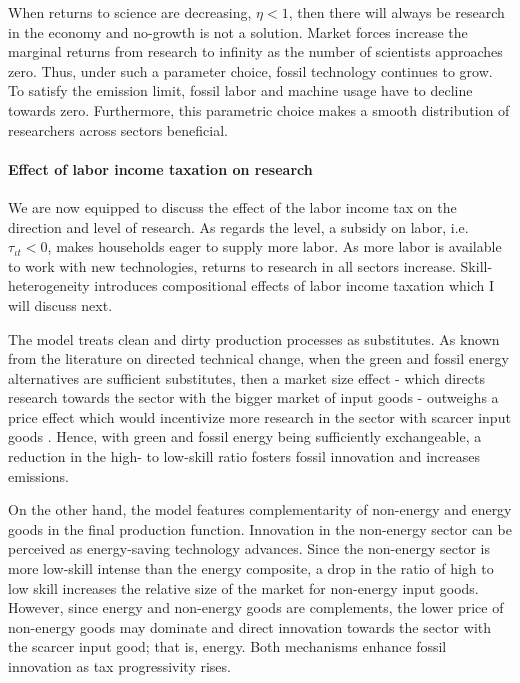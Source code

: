 When returns to science are decreasing, $\eta<1$, then there will always be research in the economy and no-growth is not a solution. Market forces increase the marginal returns from research to infinity as the number of scientists approaches zero. Thus, under such a parameter choice, fossil technology continues to grow. To satisfy the emission limit, fossil labor and machine usage have to decline towards zero. 
Furthermore, this parametric choice makes a smooth distribution of researchers across sectors beneficial. 

\paragraph{Effect of labor income taxation on research}
We are now equipped to discuss the effect of the labor income tax on the direction and level of research. As regards the level, a subsidy on labor, i.e. $\tau_{\iota t}<0$, makes households eager to supply more labor. As more labor is available to work with new technologies, returns to research in all sectors increase. Skill-heterogeneity introduces compositional effects of labor income taxation which I will discuss next. 

The model treats clean and dirty production processes as substitutes. As known from the literature on directed technical change, when the green and fossil energy alternatives are sufficient substitutes, then a market size effect - which directs research towards the sector with the bigger market of input goods - outweighs a price effect which would incentivize more research in the sector with scarcer input goods \citep{Hemous2021DirectedEconomics}. Hence, with green and fossil energy being sufficiently exchangeable, a reduction in the high- to low-skill ratio fosters fossil innovation and increases emissions. 

On the other hand, the model features complementarity of non-energy and energy goods in the final production function. Innovation in the non-energy sector can be perceived as energy-saving technology advances. Since the non-energy sector is more low-skill intense than the energy composite, a drop in the ratio of high to low skill increases the relative size of the market for non-energy input goods. However, since energy and non-energy goods are complements, the lower price of non-energy goods may dominate and direct innovation towards the sector with the scarcer input good; that is, energy.
Both mechanisms enhance fossil innovation as tax progressivity rises. 


